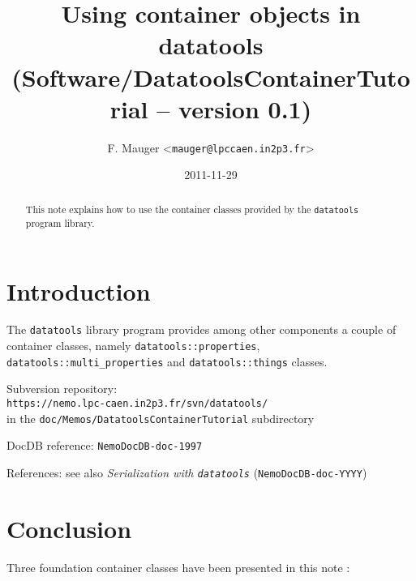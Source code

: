 \documentclass[a4paper,12pt]{article}
\title{Using container objects in datatools\\%
{\small{(Software/DatatoolsContainerTutorial -- version 0.1)}}}
\author{F. Mauger <\texttt{mauger@lpccaen.in2p3.fr}>}
\date{2011-11-29}
\newcommand{\pn}{\par\noindent}
\begin{document}
\maketitle

\begin{abstract}
This note  explains how to use  the container classes  provided by the
\texttt{datatools} program library.
\end{abstract}

\tableofcontents

\section{Introduction}

\pn  The  \texttt{datatools}  library  program  provides  among  other
components     a    couple     of     container    classes,     namely
\texttt{datatools::properties},   \texttt{datatools::multi\_properties}
and \texttt{datatools::things} classes.

\vskip 5mm
\pn
Subversion repository:\\
\texttt{https://nemo.lpc-caen.in2p3.fr/svn/datatools/} \\
in the \texttt{doc/Memos/DatatoolsContainerTutorial} subdirectory
\pn
DocDB reference: \texttt{NemoDocDB-doc-1997}
\pn
References: see also \textit{Serialization with \texttt{datatools}} 
(\texttt{NemoDocDB-doc-YYYY})

\clearpage


\clearpage


\clearpage


\clearpage

\section{Conclusion}

\pn  Three foundation container  classes have  been presented  in this
note :
\end{document}
